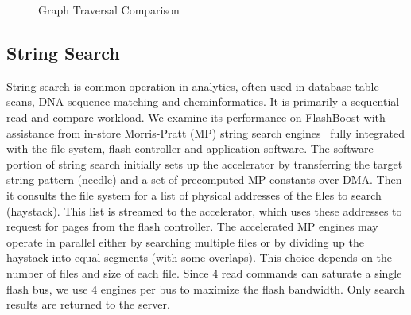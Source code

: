 
\begin{figure}[ht!]
	\centering

		\hfill
		\hfill
		\hfill
	\caption{Graph Traversal Comparison}
	\label{fig:graph_accel}
\end{figure}

\subsection{String Search}

String search is common operation in analytics, often used in
database table scans, DNA sequence matching and cheminformatics. It is 
primarily a sequential read and compare workload. We
examine its performance on FlashBoost with assistance from in-store Morris-Pratt (MP) 
string search engines~\cite{?} fully integrated with the file system, flash controller
and application software.  The software portion of string search initially sets
up the accelerator by transferring the target string pattern (needle) and a set
of precomputed MP constants over DMA. Then it consults the file system for a
list of physical addresses of the files to search (haystack).  This list is
streamed to the accelerator, which uses these addresses to request for pages
from the flash controller.  The accelerated MP engines may operate in parallel
either by searching multiple files or by dividing up the haystack into equal
segments (with some overlaps). This choice depends on the number of files and
size of each file. Since 4 read commands can saturate a single flash bus, we
use 4 engines per bus to maximize the flash bandwidth. Only
search results are returned to the server. 
